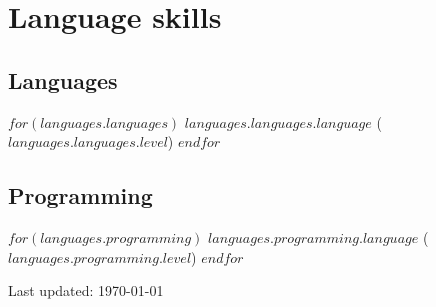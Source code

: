 \documentclass[11pt]{article} %
\begin{document}
\section*{Language skills}

\subsection*{Languages}

$for(languages.languages)$
\textsc{$languages.languages.language$} ($languages.languages.level$)
$endfor$

\subsection*{Programming}

$for(languages.programming)$
\textsc{$languages.programming.language$} ($languages.programming.level$)
$endfor$



\vfill{} %


\begin{center}
{\scriptsize Last updated: \today} 
\end{center}

\end{document}
